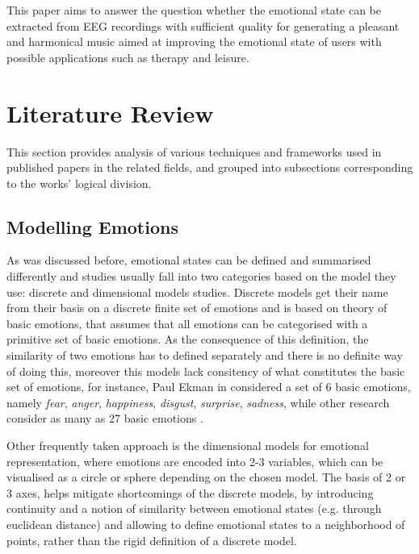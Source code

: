 \documentclass[14pt]{extreport}
\begin{document}
This paper aims to answer the question whether the emotional state can be extracted from EEG recordings with sufficient quality for generating a pleasant and harmonical music aimed at improving the emotional state of users with possible applications such as therapy and leisure.



\section{Literature Review}
This section provides analysis of various techniques and frameworks used in published papers in the related fields, and grouped into subsections corresponding to the works' logical division.

\subsection{Modelling Emotions}
As was discussed before, emotional states can be defined and summarised differently and studies usually fall into two categories based on the model they use: discrete and dimensional models studies. Discrete models get their name from their basis on a discrete finite set of emotions and is based on theory of basic emotions, that assumes that all emotions can be categorised with a primitive set of basic emotions. As the consequence of this definition, the similarity of two emotions has to defined separately and there is no definite way of doing this, moreover this models lack consitency of what constitutes the basic set of emotions, for instance, Paul Ekman in \cite{ekman} considered a set of 6 basic emotions, namely \emph{fear}, \emph{anger}, \emph{happiness}, \emph{disgust}, \emph{surprise}, \emph{sadness}, while other research consider as many as 27 basic emotions \cite{many}.

Other frequently taken approach is the dimensional models for emotional representation, where emotions are encoded into 2-3 variables, which can be visualised as a circle or sphere depending on the chosen model. The basis of 2 or 3 axes, helps mitigate shortcomings of the discrete models, by introducing continuity and a notion of similarity between emotional states (e.g. through euclidean distance) and allowing to define emotional states to a neighborhood of points, rather than the rigid definition of a discrete model.
\end{document}
